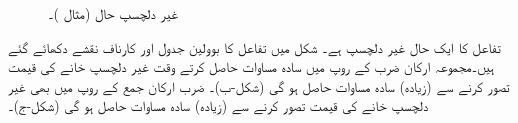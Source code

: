 \begin{figure}
\begin{subfigure}{0.33\textwidth}
\caption{}
\end{subfigure}\hfill
\begin{subfigure}{0.33\textwidth}
\centering
{}
\caption{}
\end{subfigure}
\caption{غیر دلچسپ حال (مثال )۔}
\label{شکل_بوولین_غیر_دلچسپ_پہلا}
\end{figure}
\quad
 تفاعل کا  ایک حال غیر دلچسپ ہے۔ شکل    میں  تفاعل کا بوولین جدول اور کارناف نقشے دکھائے گئے ہیں۔مجموعہ ارکان ضرب کے روپ میں سادہ مساوات حاصل کرتے وقت غیر  دلچسپ خانے کی قیمت   تصور کرنے سے  (زیادہ)  سادہ   مساوات حاصل ہو گی (شکل-ب)۔ ضرب ارکان جمع کے روپ میں بھی    غیر دلچسپ خانے کی  قیمت   تصور کرنے سے   (زیادہ)   سادہ مساوات  حاصل ہو گی (شکل-ج)۔
